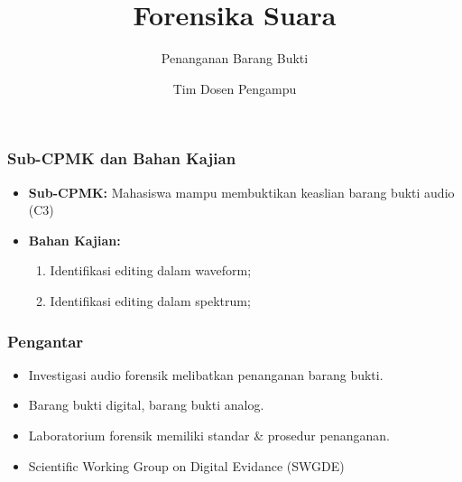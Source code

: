 \documentclass[pdflatex,compress,mathserif]{beamer}
\title{Forensika Suara}
\subtitle{Penanganan Barang Bukti}
\author{Tim Dosen Pengampu}
\begin{document}
\maketitle

\begin{frame}
	\frametitle{Sub-CPMK dan Bahan Kajian}
	\begin{itemize}
		\item \textbf{Sub-CPMK:} Mahasiswa mampu membuktikan keaslian barang bukti audio (C3)
		\item \textbf{Bahan Kajian:}
		\begin{enumerate}
			\item Identifikasi editing dalam waveform;
			\item Identifikasi editing dalam spektrum;
		\end{enumerate}
	\end{itemize}
\end{frame}

\begin{frame}
	\frametitle{Pengantar}
	\begin{itemize}
		\item Investigasi audio forensik melibatkan penanganan barang bukti.
		\item Barang bukti digital, barang bukti analog.
		\item Laboratorium forensik memiliki standar \& prosedur penanganan.
		\item Scientific Working Group on Digital Evidance (SWGDE)
	\end{itemize}
\end{frame}
\end{document}
